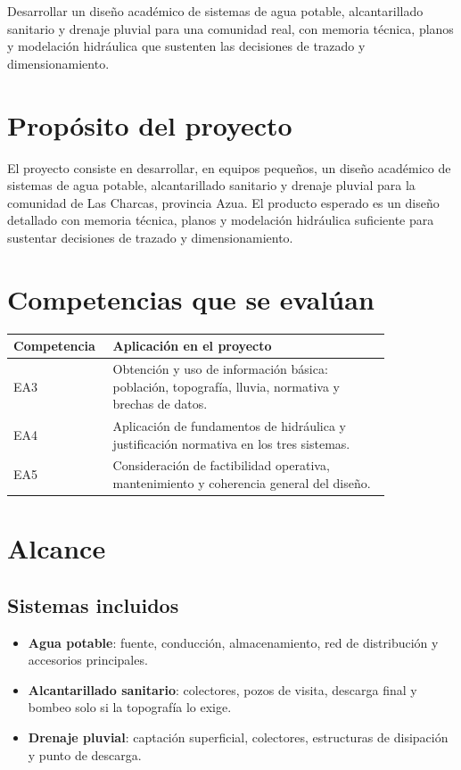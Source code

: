 \documentclass[11pt]{scrartcl}
\begin{document}
\icvmaketitle

\begin{icvobjectives}
  \item Desarrollar un diseño académico de sistemas de agua potable,
    alcantarillado sanitario y drenaje pluvial para una comunidad real,
    con memoria técnica, planos y modelación hidráulica que sustenten
    las decisiones de trazado y dimensionamiento.
\end{icvobjectives}

\section{Propósito del proyecto}
El proyecto consiste en desarrollar, en equipos pequeños, un diseño
académico de sistemas de agua potable, alcantarillado sanitario y
drenaje pluvial para la comunidad de Las Charcas, provincia Azua. El
producto esperado es un diseño detallado con memoria técnica, planos y
modelación hidráulica suficiente para sustentar decisiones de trazado y
dimensionamiento.

\section{Competencias que se evalúan}
\begin{center}
\begin{tabular}{p{0.16\linewidth} p{0.68\linewidth}}
  \toprule
  \textbf{Competencia} & \textbf{Aplicación en el proyecto} \\
  \midrule
  EA3 & Obtención y uso de información básica: población, topografía,
    lluvia, normativa y brechas de datos. \\
  EA4 & Aplicación de fundamentos de hidráulica y justificación
    normativa en los tres sistemas. \\
  EA5 & Consideración de factibilidad operativa, mantenimiento y
    coherencia general del diseño. \\
  \bottomrule
\end{tabular}
\end{center}

\section{Alcance}

\subsection{Sistemas incluidos}
\begin{itemize}
  \item \textbf{Agua potable}: fuente, conducción, almacenamiento, red
    de distribución y accesorios principales.
  \item \textbf{Alcantarillado sanitario}: colectores, pozos de visita,
    descarga final y bombeo solo si la topografía lo exige.
  \item \textbf{Drenaje pluvial}: captación superficial, colectores,
    estructuras de disipación y punto de descarga.
\end{itemize}
\end{document}
